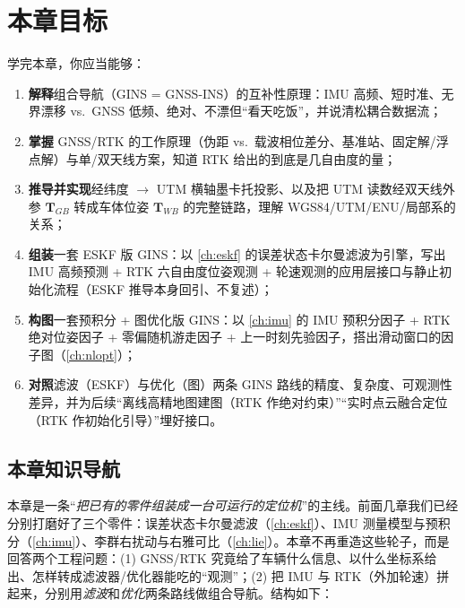 \section*{本章目标}
学完本章，你应当能够：
\begin{enumerate}
  \item \textbf{解释}组合导航（GINS = GNSS-INS）的互补性原理：IMU 高频、短时准、无界漂移 vs.\ GNSS 低频、绝对、不漂但“看天吃饭”，并说清松耦合数据流；
  \item \textbf{掌握} GNSS/RTK 的工作原理（伪距 vs.\ 载波相位差分、基准站、固定解/浮点解）与单/双天线方案，知道 RTK 给出的到底是几自由度的量；
  \item \textbf{推导并实现}经纬度 $\to$ UTM 横轴墨卡托投影、以及把 UTM 读数经双天线外参 $\mathbf{T}_{GB}$ 转成车体位姿 $\mathbf{T}_{WB}$ 的完整链路，理解 WGS84/UTM/ENU/局部系的关系；
  \item \textbf{组装}一套 ESKF 版 GINS：以 \cref{ch:eskf} 的误差状态卡尔曼滤波为引擎，写出 IMU 高频预测 + RTK 六自由度位姿观测 + 轮速观测的应用层接口与静止初始化流程（ESKF 推导本身回引、不复述）；
  \item \textbf{构图}一套预积分 + 图优化版 GINS：以 \cref{ch:imu} 的 IMU 预积分因子 + RTK 绝对位姿因子 + 零偏随机游走因子 + 上一时刻先验因子，搭出滑动窗口的因子图（\cref{ch:nlopt}）；
  \item \textbf{对照}滤波（ESKF）与优化（图）两条 GINS 路线的精度、复杂度、可观测性差异，并为后续“离线高精地图建图（RTK 作绝对约束）”“实时点云融合定位（RTK 作初始化引导）”埋好接口。
\end{enumerate}

\subsection*{本章知识导航}
本章是一条“\emph{把已有的零件组装成一台可运行的定位机}”的主线。前面几章我们已经分别打磨好了三个零件：误差状态卡尔曼滤波（\cref{ch:eskf}）、IMU 测量模型与预积分（\cref{ch:imu}）、李群右扰动与右雅可比（\cref{ch:lie}）。本章不再重造这些轮子，而是回答两个工程问题：(1) GNSS/RTK 究竟给了车辆什么信息、以什么坐标系给出、怎样转成滤波器/优化器能吃的“观测”；(2) 把 IMU 与 RTK（外加轮速）拼起来，分别用\emph{滤波}和\emph{优化}两条路线做组合导航。结构如下：

